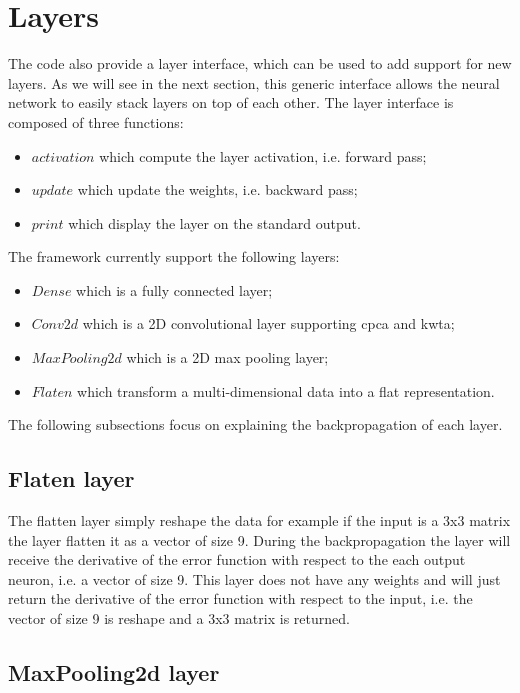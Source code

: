 \documentclass[11pt]{report}
\begin{document}
\section{Layers} \label{sec:layers}

The code also provide a layer interface, which can be used to add support for new layers. As we will see in the next section, this generic interface allows the neural network to easily stack layers on top of each other. The layer interface is composed of three functions:
\begin{itemize}
	\item $activation$ which compute the layer activation, i.e. forward pass;
	\item $update$ which update the weights, i.e. backward pass;
	\item $print$ which display the layer on the standard output.
\end{itemize}

\noindent The framework currently support the following layers:
\begin{itemize}
	\item $Dense$ which is a fully connected layer;
	\item $Conv2d$ which is a 2D convolutional layer supporting \acrshort{cpca} and  \acrshort{kwta};
	\item $MaxPooling2d$ which is a 2D max pooling layer;
	\item $Flaten$ which transform a multi-dimensional data into a flat representation.
\end{itemize}

\noindent The following subsections focus on explaining the backpropagation of each layer.

\subsection{Flaten layer}

The flatten layer simply reshape the data for example if the input is a 3x3 matrix the layer flatten it as a vector of size 9. During the backpropagation the layer will receive the derivative of the error function with respect to the each output neuron, i.e. a vector of size 9. This layer does not have any weights and will just return the derivative of the error function with respect to the input, i.e. the vector of size 9 is reshape and a 3x3 matrix is returned.

\subsection{MaxPooling2d layer}
\end{document}
